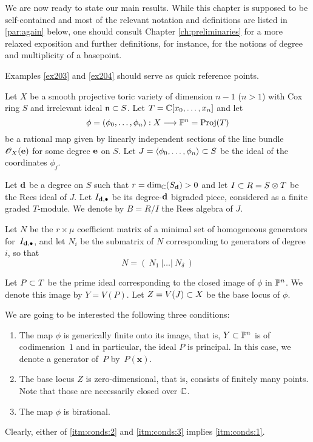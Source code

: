 \documentclass[fleqn,reqno]{amsart}
\newcounter{chapter}
\numberwithin{first}{chapter}
\begin{document}



\begin{paragraf*}
We are now ready to state our main results.
While this chapter is supposed to be self-contained and most of the relevant notation
and definitions are listed in \eqref{par:again} below,
one should consult Chapter \ref{ch:preliminaries} for a more relaxed exposition
and further definitions, for instance,
for the notions of degree and multiplicity of a basepoint.

Examples \ref{ex203} and \ref{ex204} should serve as quick reference points.
\end{paragraf*}

\begin{definition}
\label{par:again}
Let $X$ be a smooth projective toric variety of dimension $n-1$ ($n>1$)
with Cox ring $S$ and irrelevant ideal $\mathfrak{n}\subset S$.
Let $T=\mathbb{C}[x_0,\ldots,x_n]$ and let
\[
\phi=(\phi_0,\ldots,\phi_n):X\longrightarrow\mathbb{P}^n=\operatorname{Proj}(T)
\]
be a rational map given by linearly independent sections of the line bundle $\mathscr{O}_X(\mathbf e)$
for some degree $\mathbf e$ on $S$.
Let $J=\langle \phi_0,\ldots,\phi_n\rangle\subset S$ be the ideal of the coordinates $\phi_j$.

Let $\mathbf d$ be a degree on $S$ such that $r=\dim_{\mathbb{C}}(S_\mathbf d)>0$ and let $I\subset R=S\otimes T$ be the
Rees ideal of $J$. Let $I_{\mathbf d,\bullet}$ be its degree-$\mathbf d$ bigraded piece,
considered as a finite graded $T$-module.
We denote by $B=R/I$ the Rees algebra of $J$.

Let $N$ be the $r\times\mu$ coefficient matrix of
a minimal set of homogeneous generators for~$I_{\mathbf d,\bullet}$,
and let $N_i$ be the submatrix of $N$ corresponding to generators of degree $i$,
so that
\[
N=(~N_1~|\ldots|~N_\delta~)
\]
\end{definition}

\begin{definition}
\label{par:conds}
Let $P\subset T$ be the prime ideal corresponding to the closed image of $\phi$ in $\mathbb{P}^n$.
We denote this image by $Y=V(P)$.
Let $Z=V(J)\subset X$ be the base locus of $\phi$.

We are going to be interested the following three conditions:
\begin{enumerate}
\item
\label{itm:conds:1}
The map $\phi$ is generically finite onto its image, that is,
$Y\subset\mathbb{P}^n$ is of codimension~$1$ and in particular, the ideal $P$ is principal.
In this case, we denote a generator of~$P$ by~$P(\mathbf x)$.

\item
\label{itm:conds:2} The base locus $Z$ is zero-dimensional, that is,
consists of finitely many points.
Note that those are necessarily closed over $\mathbb{C}$.

\item
\label{itm:conds:3} The map $\phi$ is birational.
\end{enumerate}

Clearly, either of \eqref{itm:conds:2} and \eqref{itm:conds:3} implies \eqref{itm:conds:1}.
\end{definition}
\end{document}
